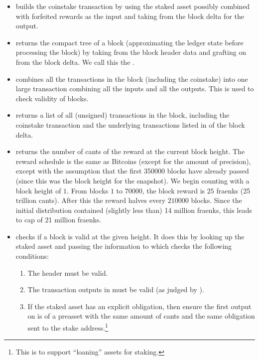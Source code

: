 \begin{itemize}
\item {} builds the coinstake transaction by
using the staked asset possibly combined with forfeited rewards as the input
and taking {} from the block delta for the output.
\item {} returns the compact tree of a block (approximating the ledger state before
processing the block) by taking {} from the block header data
and grafting on {} from the block delta.
We call this the {}.
\item {} combines all the transactions in the block (including the coinstake) into one large transaction combining all the inputs and all the outputs.
This is used to check validity of blocks.
\item {} returns a list of all (unsigned) transactions in the block,
including the coinstake transaction and the underlying transactions listed in {} of the block delta.
\item {} returns the number of cants of the reward at the current block height.
The reward schedule is the same as Bitcoins (except for the amount of precision), except with the assumption that the first 350000 blocks have already passed (since this was the block height for the snapshot).
We begin counting with a block height of $1$. From blocks $1$ to $70000$,
the block reward is $25$ fraenks (25 trillion cants).
After this the reward halves every $210000$ blocks.
Since the initial distribution contained (slightly less than) 14 million fraenks, this leads to cap of 21 million fraenks.
\item {} checks if a block is valid at the given height.
It does this by looking up the staked asset and passing the information to {}
which checks the following conditions:
\begin{enumerate}
\item The header must be valid.
\item The transaction outputs in {} must be valid (as judged by {}).
\item If the staked asset has an explicit obligation, then ensure the first output on {}
is of a preasset with the same amount of cants and the same obligation sent to the stake address.\footnote{This is to support ``loaning'' assets for staking.}

\end{enumerate}
\end{itemize}
